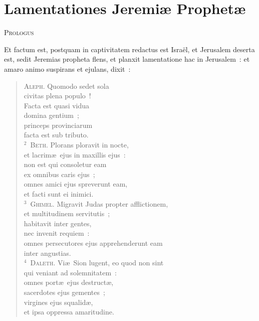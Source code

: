 \clearpage
{\centering \section*{Lamentationes Jeremiæ Prophetæ}}\thispagestyle{empty}

\begin{center}\textsc{Prologus}\end{center}\vspace{-6pt} Et factum est, postquam in captivitatem redactus est Isra\"el, et Jerusalem deserta est, sedit Jeremias propheta flens, et planxit lamentatione hac in Jerusalem~: et amaro animo suspirans et ejulans, dixit~: 

\begin{flushleft}\begin{verse}\vspace{-19pt}\textsc{Aleph.} Quomodo sedet sola\\ civitas plena populo~!\\ Facta est quasi vidua\\ domina gentium~;\\ princeps provinciarum\\ facta est sub tributo.\\
${}^{2}$~\textsc{Beth.} Plorans ploravit in nocte,\\ et lacrim\ae\ ejus in maxillis ejus~:\\ non est qui consoletur eam\\ ex omnibus caris ejus~;\\ omnes amici ejus spreverunt eam,\\ et facti sunt ei inimici.\\
${}^{3}$~\textsc{Ghimel.} Migravit Judas propter afflictionem,\\ et multitudinem servitutis~;\\ habitavit inter gentes,\\ nec invenit requiem~:\\ omnes persecutores ejus apprehenderunt eam\\ inter angustias.\\
${}^{4}$~\textsc{Daleth.} Vi\ae\ Sion lugent, eo quod non sint\\ qui veniant ad solemnitatem~:\\ omnes port\ae\ ejus destruct\ae ,\\ sacerdotes ejus gementes~;\\ virgines ejus squalid\ae ,\\ et ipsa oppressa amaritudine.\\

\end{verse}
\end{flushleft}
